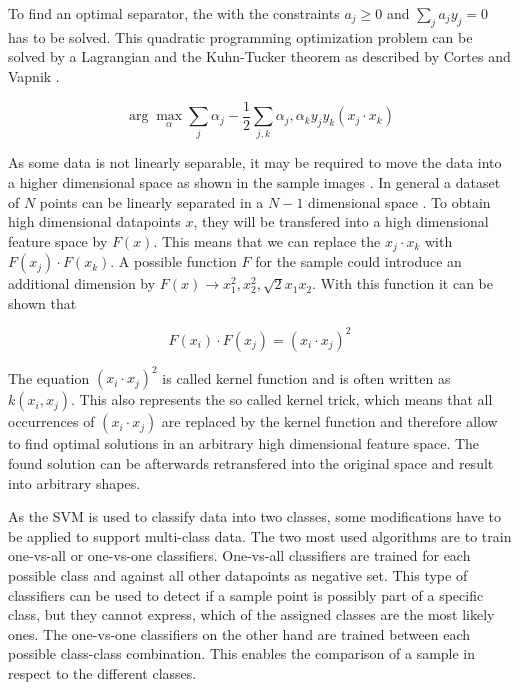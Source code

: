 To find an optimal separator, the  with the constraints $a_j \ge 0$ and $\sum_j a_j y_j = 0$ has to be solved. This quadratic programming optimization problem can be solved by a Lagrangian and the Kuhn-Tucker theorem as described by Cortes and Vapnik \cite{cortes1995support}.

\begin{equation}
\arg\max_\alpha \sum_j \alpha_j - \frac{1}{2} \sum_{j,k} \alpha_j, \alpha_k y_j y_k (x_j \cdot x_k)
\label{eqn:svm:maxmarg}
\end{equation}

As some data is not linearly separable, it may be required to move the data into a higher dimensional space as shown in the sample images . In general a dataset of $N$ points can be linearly separated in a $N-1$ dimensional space \cite{russellnorvig-ai}.
To obtain high dimensional datapoints $x$, they will be transfered into a high dimensional feature space by $F(x)$. This means that we can replace the $x_j \cdot x_k$ with $F(x_j) \cdot F(x_k)$. A possible function $F$ for the sample could introduce an additional dimension by $F(x) \rightarrow x_1^2, x_2^2, \sqrt{2} x_1 x_2$. With this function it can be shown that

\begin{equation}
F(x_i) \cdot F(x_j) = (x_i \cdot x_j)^2
\end{equation}

The equation $(x_i \cdot x_j)^2$ is called kernel function and is often written as $k(x_i, x_j)$. This also represents the so called kernel trick, which means that all occurrences of $(x_i \cdot x_j)$ are replaced by the kernel function and therefore allow to find optimal solutions in an arbitrary high dimensional feature space. The found solution can be afterwards retransfered into the original space and result into arbitrary shapes.

As the \ac{SVM} is used to classify data into two classes, some modifications have to be applied to support multi-class data. The two most used algorithms are to train one-vs-all or one-vs-one classifiers. One-vs-all classifiers are trained for each possible class and against all other datapoints as negative set. This type of classifiers can be used to detect if a sample point is possibly part of a specific class, but they cannot express, which of the assigned classes are the most likely ones. The one-vs-one classifiers on the other hand are trained between each possible class-class combination. This enables the comparison of a sample in respect to the different classes.

